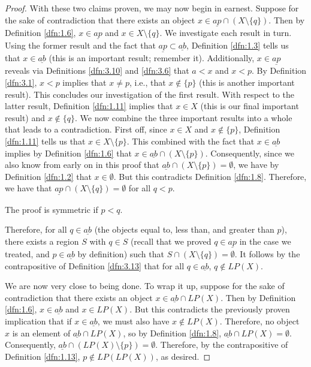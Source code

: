 \documentclass[../main.tex]{subfiles}
\begin{document}
\begin{theorem}
\begin{lemma*}
\begin{proof}
            With these two claims proven, we may now begin in earnest. Suppose for the sake of contradiction that there exists an object $x\in\underline{ap}\cap(X\setminus\{q\})$. Then by Definition \ref{dfn:1.6}, $x\in\underline{ap}$ and $x\in X\setminus\{q\}$. We investigate each result in turn. Using the former result and the fact that $\underline{ap}\subset\underline{ab}$, Definition \ref{dfn:1.3} tells us that $x\in\underline{ab}$ (this is an important result; remember it). Additionally, $x\in\underline{ap}$ reveals via Definitions \ref{dfn:3.10} and \ref{dfn:3.6} that $a<x$ and $x<p$. By Definition \ref{dfn:3.1}, $x<p$ implies that $x\neq p$, i.e., that $x\notin\{p\}$ (this is another important result). This concludes our investigation of the first result. With respect to the latter result, Definition \ref{dfn:1.11} implies that $x\in X$ (this is our final important result) and $x\notin\{q\}$. We now combine the three important results into a whole that leads to a contradiction. First off, since $x\in X$ and $x\notin\{p\}$, Definition \ref{dfn:1.11} tells us that $x\in X\setminus\{p\}$. This combined with the fact that $x\in\underline{ab}$ implies by Definition \ref{dfn:1.6} that $x\in\underline{ab}\cap(X\setminus\{p\})$. Consequently, since we also know from early on in this proof that $\underline{ab}\cap(X\setminus\{p\})=\emptyset$, we have by Definition \ref{dfn:1.2} that $x\in\emptyset$. But this contradicts Definition \ref{dfn:1.8}. Therefore, we have that $\underline{ap}\cap(X\setminus\{q\})=\emptyset$ for all $q<p$.\par\smallskip
            The proof is symmetric if $p<q$.\par\medskip
            Therefore, for all $q\in\underline{ab}$ (the objects equal to, less than, and greater than $p$), there exists a region $S$ with $q\in S$ (recall that we proved $q\in\underline{ap}$ in the case we treated, and $p\in\underline{ab}$ by definition) such that $S\cap(X\setminus\{q\})=\emptyset$. It follows by the contrapositive of Definition \ref{dfn:3.13} that for all $q\in\underline{ab}$, $q\notin LP(X)$.\par\medskip
            We are now very close to being done. To wrap it up, suppose for the sake of contradiction that there exists an object $x\in\underline{ab}\cap LP(X)$. Then by Definition \ref{dfn:1.6}, $x\in\underline{ab}$ and $x\in LP(X)$. But this contradicts the previously proven implication that if $x\in\underline{ab}$, we must also have $x\notin LP(X)$. Therefore, no object $x$ is an element of $\underline{ab}\cap LP(X)$, so by Definition \ref{dfn:1.8}, $\underline{ab}\cap LP(X)=\emptyset$. Consequently, $\underline{ab}\cap(LP(X)\setminus\{p\})=\emptyset$. Therefore, by the contrapositive of Definition \ref{dfn:1.13}, $p\notin LP(LP(X))$, as desired.

\end{proof}
\end{lemma*}
\end{theorem}
\end{document}
